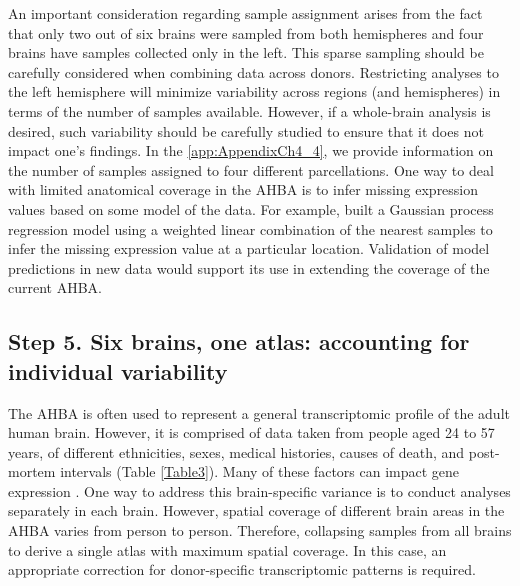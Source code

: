 An important consideration regarding sample assignment arises from the fact that only two out of six brains were sampled from both hemispheres and four brains have samples collected only in the left. This sparse sampling should be carefully considered when combining data across donors. Restricting analyses to the left hemisphere will minimize variability across regions (and hemispheres) in terms of the number of samples available. However, if a whole-brain analysis is desired, such variability should be carefully studied to ensure that it does not impact one’s findings. In the \ref{app:AppendixCh4_4}, we provide information on the number of samples assigned to four different parcellations. One way to deal with limited anatomical coverage in the AHBA is to infer missing expression values based on some model of the data. For example, \citet{Gryglewski2018} built a Gaussian process regression model using a weighted linear combination of the nearest samples to infer the missing expression value at a particular location. Validation of model predictions in new data would support its use in extending the coverage of the current AHBA.

\subsection*{Step 5. Six brains, one atlas: accounting for individual variability}

The AHBA is often used to represent a general transcriptomic profile of the adult human brain. However, it is comprised of data taken from people aged 24 to 57 years, of different ethnicities, sexes, medical histories, causes of death, and post-mortem intervals (Table \ref{Table3}). Many of these factors can impact gene expression \citep{Fraser2005,Berchtold2008,Kumar2013,Trabzuni2013}. One way to address this brain-specific variance is to conduct analyses separately in each brain. However, spatial coverage of different brain areas in the AHBA varies from person to person. Therefore, collapsing samples from all brains to derive a single atlas with maximum spatial coverage. In this case, an appropriate correction for donor-specific transcriptomic patterns is required.


